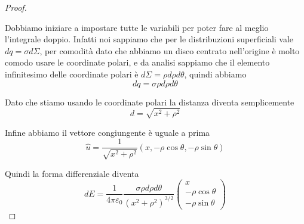 \documentclass{rapport}
\begin{document}
\begin{proof}
\begin{center}
\end{center}


Dobbiamo iniziare a impostare tutte le variabili per poter fare al meglio l'integrale doppio. Infatti noi sappiamo che per le distribuzioni superficiali vale $dq = \sigma d\Sigma$, per comodità dato che abbiamo un disco centrato nell'origine è molto comodo usare le coordinate polari, e da analisi sappiamo che il elemento infinitesimo delle coordinate polari è $d\Sigma = \rho d\rho d\theta$, quindi abbiamo  
\[dq = \sigma \rho d\rho d\theta\] 

Dato che stiamo usando le coordinate polari la distanza diventa semplicemente 
\[
d = \sqrt{x^2+\rho^2}
\]

Infine abbiamo il vettore congiungente è uguale a prima
\[
\hat{u} = \dfrac{1}{\sqrt{x^2+\rho^2}} (x, -\rho\cos\theta,-\rho\sin\theta)
\]

Quindi la forma differenziale diventa
\[
dE = \dfrac{1}{4\pi\varepsilon_0} \dfrac{\sigma \rho d\rho d\theta}{(x^2+\rho^2)^{3/2}} \begin{pmatrix}
  x \\
  -\rho\cos\theta\\
  -\rho\sin\theta
\end{pmatrix}
\]



\end{proof}
\end{document}
